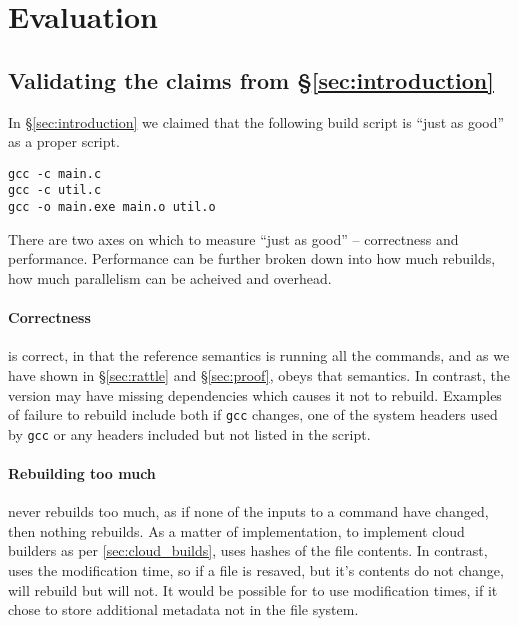 \section{Evaluation}
\label{sec:evaluation}

\subsection{Validating the claims from \S\ref{sec:introduction}}

In \S\ref{sec:introduction} we claimed that the following build script is ``just as good'' as a proper \Make script.

\begin{verbatim}
gcc -c main.c
gcc -c util.c
gcc -o main.exe main.o util.o
\end{verbatim}

There are two axes on which to measure ``just as good'' -- correctness and performance. Performance can be further broken down into how much rebuilds, how much parallelism can be acheived and overhead.

\paragraph{Correctness} \Rattle is correct, in that the reference semantics is running all the commands, and as we have shown in \S\ref{sec:rattle} and \S\ref{sec:proof}, \Rattle obeys that semantics. In contrast, the \Make version may have missing dependencies which causes it not to rebuild. Examples of failure to rebuild include both if \texttt{gcc} changes, one of the system headers used by \texttt{gcc} or any headers included but not listed in the \Make script.

\paragraph{Rebuilding too much} \Rattle never rebuilds too much, as if none of the inputs to a command have changed, then nothing rebuilds. As a matter of implementation, to implement cloud builders as per \ref{sec:cloud_builds}, \Rattle uses hashes of the file contents. In contrast, \Make uses the modification time, so if a file is resaved, but it's contents do not change, \Make will rebuild but \Rattle will not. It would be possible for \Make to use modification times, if it chose to store additional metadata not in the file system.


